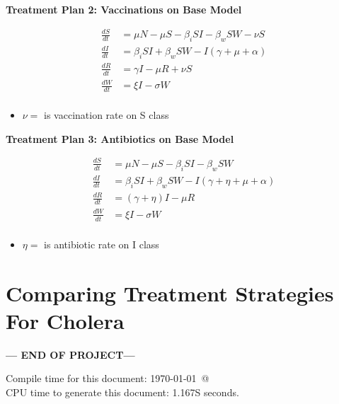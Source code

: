 \documentclass[12pt]{article}\usepackage[]{graphicx}\usepackage[]{color}
\begin{document}
\textbf{Treatment Plan 2: Vaccinations on Base Model}

\begin{align*}
	\frac{dS}{dt}&= \mu N - \mu S - \beta_i SI - \beta_w S W - \nu S \\
	\frac{dI}{dt}&= \beta_i S I + \beta_w S W - I (\gamma + \mu + \alpha) \\
	\frac{dR}{dt}&= \gamma I - \mu R + \nu S\\
	\frac{dW}{dt}&= \xi I  - \sigma W\\
\end{align*}

\begin{itemize}
	\item $\nu=$ is vaccination rate on S class
\end{itemize}

\textbf{Treatment Plan 3: Antibiotics on Base Model}

\begin{align*}
	\frac{dS}{dt}&= \mu N - \mu S - \beta_i SI - \beta_w S W \\
	\frac{dI}{dt}&= \beta_i S I + \beta_w S W - I (\gamma +\eta + \mu + \alpha ) \\
	\frac{dR}{dt}&= (\gamma +\eta)I - \mu R \\
	\frac{dW}{dt}&= \xi I  - \sigma W\\
\end{align*}
\begin{itemize}
	\item $\eta=$ is antibiotic rate on I class
\end{itemize}

\section{Comparing Treatment Strategies For Cholera}



\bigskip\vfill
\centerline{\bf--- END OF PROJECT---}
\bigskip
Compile time for this document:
\today\ @ \thistime\\
CPU time to generate this document: 1.167S seconds.
\printbibliography
\end{document}
